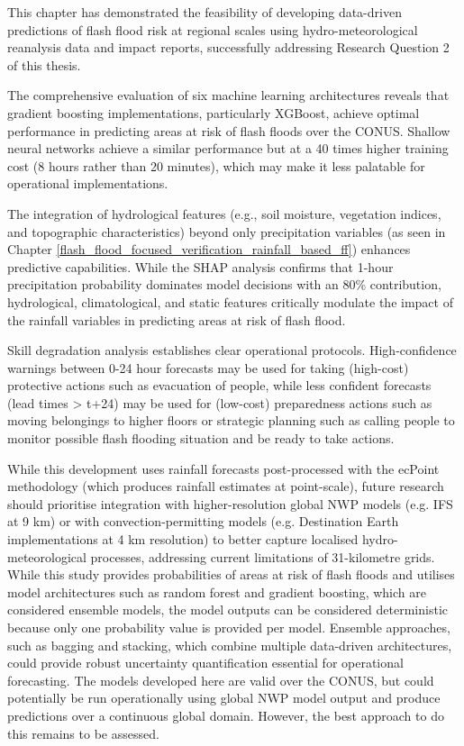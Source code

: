This chapter has demonstrated the feasibility of developing data-driven predictions of flash flood risk at regional scales using hydro-meteorological reanalysis data and impact reports, successfully addressing Research Question 2 of this thesis. 

The comprehensive evaluation of six machine learning architectures reveals that gradient boosting implementations, particularly XGBoost, achieve optimal performance in predicting areas at risk of flash floods over the CONUS. Shallow neural networks achieve a similar performance but at a 40 times higher training cost (8 hours rather than 20 minutes), which may make it less palatable for operational implementations. 

The integration of hydrological features (e.g., soil moisture, vegetation indices, and topographic characteristics) beyond only precipitation variables (as seen in Chapter \ref{flash_flood_focused_verification_rainfall_based_ff}) enhances predictive capabilities. While the SHAP analysis confirms that 1-hour precipitation probability dominates model decisions with an 80\% contribution, hydrological, climatological, and static features critically modulate the impact of the rainfall variables in predicting areas at risk of flash flood.

Skill degradation analysis establishes clear operational protocols. High-confidence warnings between 0-24 hour forecasts may be used for taking (high-cost) protective actions such as evacuation of people, while less confident forecasts (lead times > t+24) may be used for (low-cost) preparedness actions such as moving belongings to higher floors or strategic planning such as calling people to monitor possible flash flooding situation and be ready to take actions. 

While this development uses rainfall forecasts post-processed with the ecPoint methodology (which produces rainfall estimates at point-scale), future research should prioritise integration with higher-resolution global NWP models (e.g. IFS at 9 km) or with convection-permitting models (e.g. Destination Earth implementations at 4 km resolution) to better capture localised hydro-meteorological processes, addressing current limitations of 31-kilometre grids. While this study provides probabilities of areas at risk of flash floods and utilises model architectures such as random forest and gradient boosting, which are considered ensemble models, the model outputs can be considered deterministic because only one probability value is provided per model. Ensemble approaches, such as bagging and stacking, which combine multiple data-driven architectures, could provide robust uncertainty quantification essential for operational forecasting. The models developed here are valid over the CONUS, but could potentially be run operationally using global NWP model output and produce predictions over a continuous global domain. However, the best approach to do this remains to be assessed.
